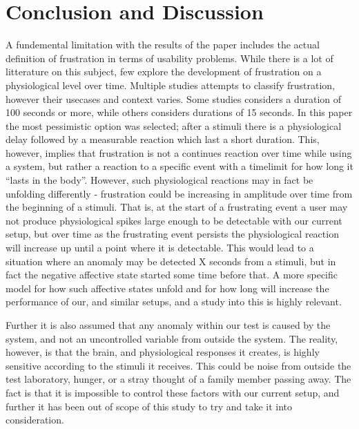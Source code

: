 \section{Conclusion and Discussion}
A fundemental limitation with the results of the paper includes the actual definition of frustration in terms of usability problems. 
While there is a lot of litterature on this subject, few explore the development of frustration on a physiological level over time. 
Multiple studies attempts to classify frustration, however their usecases and context varies. 
Some studies considers a duration of 100 seconds or more\cite{machine_learning_100s_gsr}, while others considers durations of 15 seconds\cite{brainwave_signals_frustration}.
In this paper the most pessimistic option was selected; after a stimuli there is a physiological delay followed by a measurable reaction which last a short duration.
This, however, implies that frustration is not a continues reaction over time while using a system, but rather a reaction to a specific event with a timelimit for how long it ``lasts in the body''.
However, such physiological reactions may in fact be unfolding differently - frustration could be increasing in amplitude over time from the beginning of a stimuli. 
That is, at the start of a frustrating event a user may not produce physiological spikes large enough to be detectable with our current setup, but over time as the frustrating event persists the physiological reaction will increase up until a point where it is detectable. 
This would lead to a situation where an anomaly may be detected X seconds from a stimuli, but in fact the negative affective state started some time before that.
A more specific model for how such affective states unfold and for how long will increase the performance of our, and similar setups, and
a study into this is highly relevant.

Further it is also assumed that any anomaly within our test is caused by the system, and not an uncontrolled variable from outside the system. 
The reality, however, is that the brain, and physiological responses it creates, is highly sensitive according to the stimuli it receives.
This could be noise from outside the test laboratory, hunger, or a stray thought of a family member passing away. 
The fact is that it is impossible to control these factors with our current setup, and further it has been out of scope of this study to try and take it into consideration.

